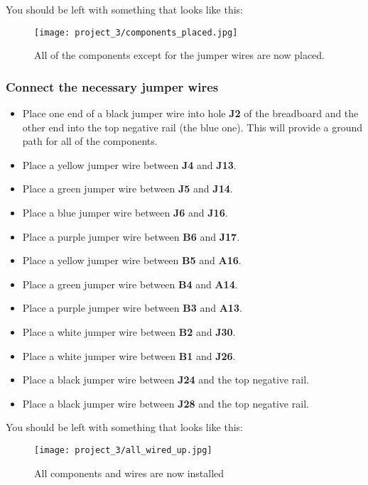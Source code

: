 You should be left with something that looks like this:
\begin{figure}[H]
    \centering
    \texttt{[image: project\_3/components\_placed.jpg]}
    \caption{All of the components except for the jumper wires are now placed.}
\end{figure}

\subsubsection{Connect the necessary jumper wires}
\begin{itemize}
    \item Place one end of a black jumper wire into hole \textbf{J2} of the breadboard and the other end into
    the top negative rail (the blue one). This will provide a ground path for all of the components.
    \item Place a yellow jumper wire between \textbf{J4} and \textbf{J13}.
    \item Place a green jumper wire between \textbf{J5} and \textbf{J14}.
    \item Place a blue jumper wire between \textbf{J6} and \textbf{J16}.
    \item Place a purple jumper wire between \textbf{B6} and \textbf{J17}.
    \item Place a yellow jumper wire between \textbf{B5} and \textbf{A16}.
    \item Place a green jumper wire between \textbf{B4} and \textbf{A14}.
    \item Place a purple jumper wire between \textbf{B3} and \textbf{A13}.
    \item Place a white jumper wire between \textbf{B2} and \textbf{J30}.
    \item Place a white jumper wire between \textbf{B1} and \textbf{J26}.
    \item Place a black jumper wire between \textbf{J24} and the top negative rail.
    \item Place a black jumper wire between \textbf{J28} and the top negative rail.
\end{itemize}

You should be left with something that looks like this:
\begin{figure}[H]
    \centering
    \texttt{[image: project\_3/all\_wired\_up.jpg]}
    \caption{All components and wires are now installed}
\end{figure}

